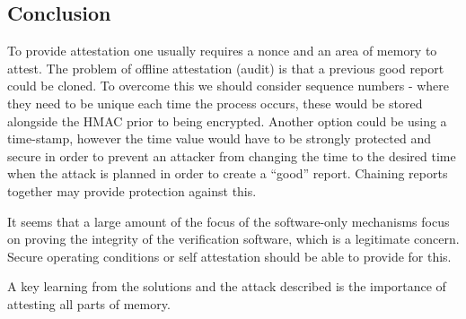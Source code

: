 \subsection{Conclusion}

To provide attestation one usually requires a nonce and an area of memory to attest. The problem of offline attestation (audit) is that a previous good report could be cloned. To overcome this we should consider sequence numbers - where they need to be unique each time the process occurs, these would be stored alongside the HMAC prior to being encrypted. Another option could be using a time-stamp, however the time value would have to be strongly protected and secure in order to prevent an attacker from changing the time to the desired time when the attack is planned in order to create a ``good'' report. Chaining reports together may provide protection against this.

It seems that a large amount of the focus of the software-only mechanisms focus on proving the integrity of the verification software, which is a legitimate concern. Secure operating conditions or self attestation should  be able to provide for this.

A key learning from the solutions and the attack described is the importance of attesting all parts of memory.
